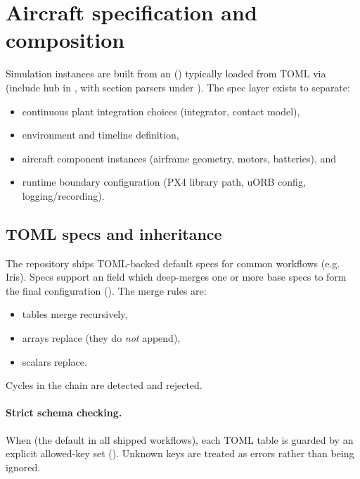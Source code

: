 \section{Aircraft specification and composition}
\label{sec:configuration}

Simulation instances are built from an  () typically loaded from TOML via  (include hub in , with section parsers under ). The spec layer exists to separate:
\begin{itemize}[leftmargin=*,itemsep=2pt]
  \item continuous plant integration choices (integrator, contact model),
  \item environment and timeline definition,
  \item aircraft component instances (airframe geometry, motors, batteries), and
  \item runtime boundary configuration (PX4 library path, uORB config, logging/recording).
\end{itemize}

\subsection{TOML specs and inheritance}

The repository ships TOML-backed default specs for common workflows (e.g. Iris). Specs support an  field which deep-merges one or more base specs to form the final configuration (). The merge rules are:
\begin{itemize}[leftmargin=*,itemsep=2pt]
  \item tables merge recursively,
  \item arrays replace (they do \emph{not} append),
  \item scalars replace.
\end{itemize}
Cycles in the  chain are detected and rejected.

\paragraph{Strict schema checking.}
When  (the default in all shipped workflows), each TOML table is guarded by an explicit allowed-key set (). Unknown keys are treated as errors rather than being ignored.

